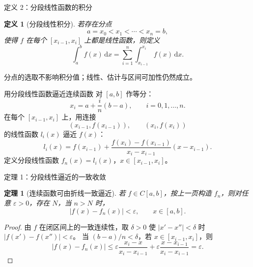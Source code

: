﻿\documentclass[aspectratio=169,11pt]{ctexbeamer}
\newtheorem{mydef}{定义}
\newtheorem{mythm}{定理}
\newcommand{\dd}{\,\mathrm{d}}
\newcommand{\abs}[1]{\left|#1\right|}
\begin{document}
\begin{frame}{定义 2：分段线性函数的积分}
  \footnotesize
  \begin{mydef}[分段线性积分]
  若存在分点
  \[
    a=x_0<x_1<\cdots<x_n=b,
  \]
  使得 $f$ 在每个 $[x_{i-1},x_i]$ 上都是线性函数，则定义
  \[
    \int_a^b f(x)\dd x
    =\sum_{i=1}^{n}\int_{x_{i-1}}^{x_i}f(x)\dd x.
  \]
  \end{mydef}
  分点的选取不影响积分值；线性、估计与区间可加性仍然成立。

  \begin{center}
  \end{center}
\end{frame}

\begin{frame}{用分段线性函数逼近连续函数}
  对 $[a,b]$ 作等分：
  \[
    x_i=a+\frac{i}{n}(b-a),\qquad i=0,1,\ldots,n.
  \]
  在每个 $[x_{i-1},x_i]$ 上，用连接
  \[
    (x_{i-1},f(x_{i-1})),\qquad (x_i,f(x_i))
  \]
  的线性函数 $l_i(x)$ 逼近 $f(x)$：
  \[
    l_i(x)=f(x_{i-1})+
    \frac{f(x_i)-f(x_{i-1})}{x_i-x_{i-1}}(x-x_{i-1}).
  \]
  定义分段线性函数 $f_n(x)=l_i(x)$，$x\in[x_{i-1},x_i]$。
\end{frame}

\begin{frame}{定理 1：分段线性逼近的一致收敛}
  \begin{mythm}[连续函数可由折线一致逼近]
  若 $f\in C[a,b]$，按上一页构造 $f_n$，则对任意 $\varepsilon>0$，存在 $N$，当 $n>N$ 时，
  \[
    \abs{f(x)-f_n(x)}<\varepsilon,\qquad x\in[a,b].
  \]
  \end{mythm}

  \begin{proof}
  由 $f$ 在闭区间上的一致连续性，取 $\delta>0$ 使
  $\abs{x'-x''}<\delta$ 时 $\abs{f(x')-f(x'')}<\varepsilon$。
  当 $(b-a)/n<\delta$，若 $x\in[x_{i-1},x_i]$，则
  \[
    \abs{f(x)-f_n(x)}
    \le \varepsilon\frac{x_i-x}{x_i-x_{i-1}}
       +\varepsilon\frac{x-x_{i-1}}{x_i-x_{i-1}}
    =\varepsilon.
  \]
  \end{proof}
\end{frame}
\end{document}
